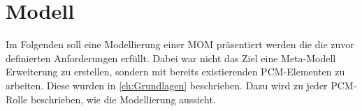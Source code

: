


\section{Modell}
\label{sec:modell}
Im Folgenden soll eine Modellierung einer MOM präsentiert werden die die zuvor definierten Anforderungen erfüllt. Dabei war nicht das Ziel eine Meta-Modell Erweiterung zu erstellen, sondern mit bereits existierenden PCM-Elementen zu arbeiten. Diese wurden in \autoref{ch:Grundlagen} beschrieben. Dazu wird zu jeder PCM-Rolle beschrieben, wie die Modellierung aussieht.


